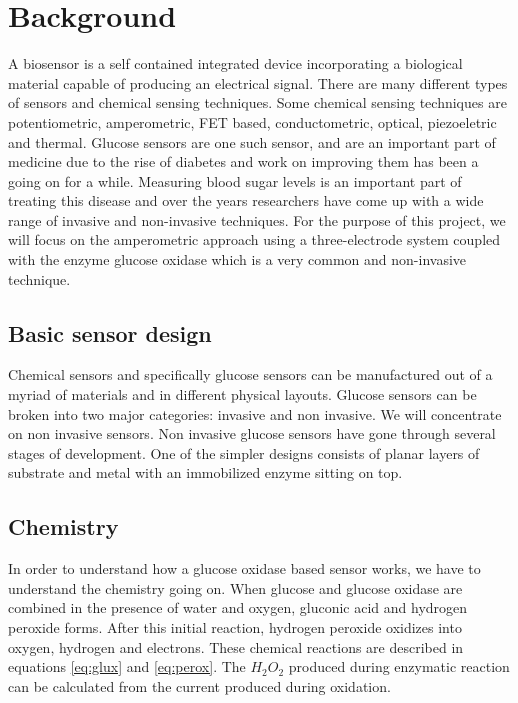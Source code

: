 \section{Background}
A biosensor is a self contained integrated device incorporating a biological material capable of producing an electrical signal. There are many different types of sensors and chemical sensing techniques. Some chemical sensing techniques are potentiometric, amperometric, FET based, conductometric, optical, piezoeletric and thermal. Glucose sensors are one such sensor, and are an important part of medicine due to the rise of diabetes and work on improving them has been a going on for a while. \cite{Cramp:1967} Measuring blood sugar levels is an important part of treating this disease and over the years researchers have come up with a wide range of invasive and non-invasive techniques. \cite{Oliver:2009} For the purpose of this project, we will focus on the amperometric approach using a three-electrode system coupled with the enzyme glucose oxidase which is a very common and non-invasive technique. \cite{Cui:2001} \cite{Jui-Lin:2011} 

\subsection{Basic sensor design}
Chemical sensors and specifically glucose sensors can be manufactured out of a myriad of materials and in different physical layouts. Glucose sensors can be broken into two major categories: invasive and non invasive. We will concentrate on non invasive sensors. Non invasive glucose sensors have gone through several stages of development. \cite{Wang:2012} One of the simpler designs consists of planar layers of substrate and metal with an immobilized enzyme sitting on top.

\subsection{Chemistry}
In order to understand how a glucose oxidase based sensor works, we have to understand the chemistry going on. When glucose and glucose oxidase are combined in the presence of water and oxygen, gluconic acid and hydrogen peroxide forms. After this initial reaction, hydrogen peroxide oxidizes into oxygen, hydrogen and electrons. These chemical reactions are described in equations \ref{eq:glux} and \ref{eq:perox}. The $ H_{2}O_{2}$ produced during enzymatic reaction can be calculated from the current produced during oxidation.

